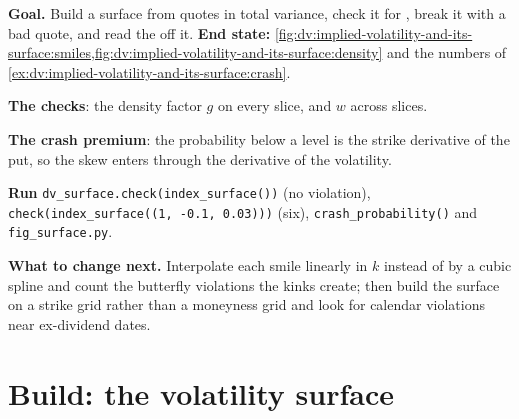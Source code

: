 \begin{tutorial}
\textbf{Goal.} Build a surface from quotes in total variance, check it for ,
break it with a bad quote, and read the  off it. \textbf{End state:}
\cref{fig:dv:implied-volatility-and-its-surface:smiles,fig:dv:implied-volatility-and-its-surface:density}
and the numbers of \cref{ex:dv:implied-volatility-and-its-surface:crash}.
\begin{tutsteps}
\item \textbf{The checks}: the density factor $g$ on every slice, and $w$ across slices.
\label{lst:dv:implied-volatility-and-its-surface:check}
\item \textbf{The crash premium}: the probability below a level is the strike derivative of
the put, so the skew enters through the derivative of the volatility.
\label{lst:dv:implied-volatility-and-its-surface:crash}
\item \textbf{Run} \texttt{dv\_surface.check(index\_surface())} (no violation),
\texttt{check(index\_surface((1, -0.1, 0.03)))} (six), \texttt{crash\_probability()} and
\texttt{fig\_surface.py}.
\end{tutsteps}
\textbf{What to change next.} Interpolate each smile linearly in $k$ instead of by a cubic
spline and count the butterfly violations the kinks create; then build the surface on a strike
grid rather than a moneyness grid and look for calendar violations near ex-dividend dates.
\end{tutorial}

\section{Build: the volatility surface}\label{bld:dv:implied-volatility-and-its-surface:volsurface}

